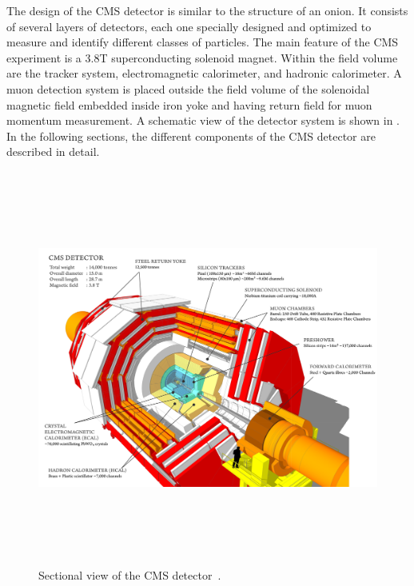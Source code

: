 The design of the CMS detector is similar to the structure of an onion. It consists of several layers of detectors, each one specially designed and
optimized to measure and identify different classes of particles. The main feature of the CMS experiment is a 3.8\unit{T} superconducting solenoid
magnet. Within the field volume are the tracker system, electromagnetic calorimeter, and hadronic calorimeter. A muon detection system is placed
outside the field volume of the solenoidal magnetic field embedded inside iron yoke and having return field for muon momentum measurement. 
A schematic view of the detector system is shown in \fig{\ref{fig:cmsDetector}}. In the following sections, the different components of the CMS 
detector are described in detail.

\begin{figure}[h!]
\centering
\includegraphics[width=16cm,height=13cm]{ch2/figures/cmsDetector.png}
\caption{Sectional view of the CMS detector~\cite{Web:CERNcds}.}
\label{fig:cmsDetector}
\end{figure}

